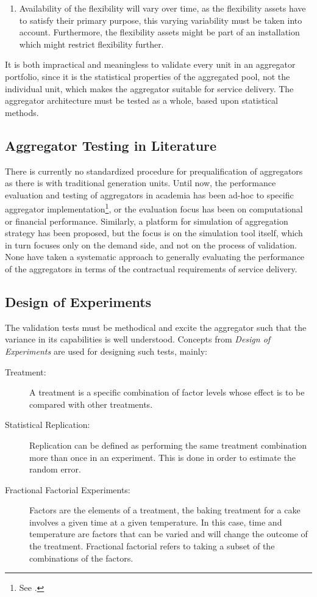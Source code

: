 \begin{enumerate}
	\item Availability of the flexibility will vary over time, as the flexibility assets have to satisfy their primary purpose, this varying variability must be taken into account. Furthermore, the flexibility assets might be part of an installation which might restrict flexibility further.
\end{enumerate}

It is both impractical and meaningless to validate every unit in an aggregator portfolio, since it is the statistical properties of the aggregated pool, not the individual unit, which makes the aggregator suitable for service delivery. The aggregator architecture must be tested as a whole, based upon statistical methods.

\subsection{Aggregator Testing in Literature}\label{subsec:aggtest}
There is currently no standardized procedure for prequalification of aggregators as there is with traditional generation units. Until now, the performance evaluation and testing of aggregators in academia has been ad-hoc to specific aggregator implementation\footnote{See \eg \cite{vrettos2015integrating,hu2014coordinated,leemput2012a}.}, or the evaluation focus has been on computational or financial performance. Similarly, a platform for simulation of aggregation strategy has been proposed, but the focus is on the simulation tool itself, which in turn focuses only on the demand side, and not on the process of validation. None have taken a systematic approach to generally evaluating the performance of the aggregators in terms of the contractual requirements of service delivery.

\subsection{Design of Experiments} %
\label{sub:DesignofExperiments}
The validation tests must be methodical and excite the aggregator such that the variance in its capabilities is well understood. Concepts from \emph{Design of Experiments} are used for designing such tests, mainly:
\begin{description}
	\item[Treatment:] A treatment is a specific combination of factor levels whose effect is to be compared with other treatments.
	\item[Statistical Replication:] Replication can be defined as performing the same treatment combination more than once in an experiment. This is done in order to estimate the random error. 
	\item[Fractional Factorial Experiments:] Factors are the elements of a treatment, \eg the baking treatment for a cake involves a given time at a given temperature. In this case, time and temperature are factors that can be varied and will change the outcome of the treatment. Fractional factorial refers to taking a subset of the combinations of the factors.
\end{description}


